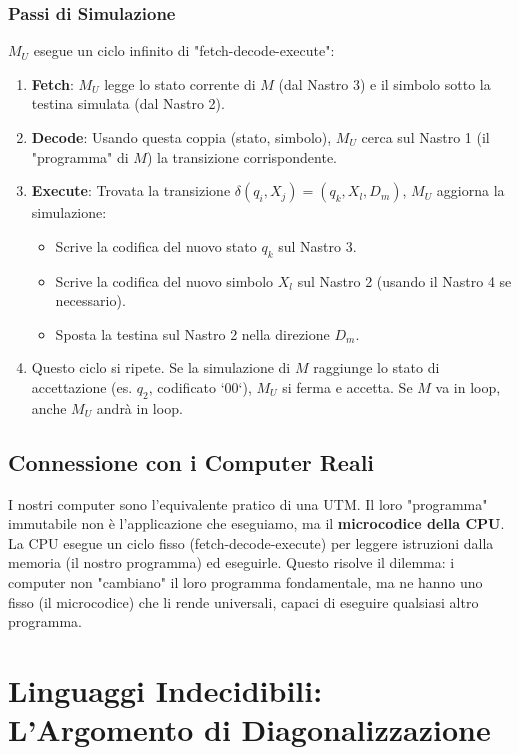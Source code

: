 \documentclass[a4paper]{article}
\theoremstyle{definition} %
\theoremstyle{remark} %
\begin{document}
\subsubsection{Passi di Simulazione}
$M_U$ esegue un ciclo infinito di "fetch-decode-execute":
\begin{enumerate}
    \item \textbf{Fetch}: $M_U$ legge lo stato corrente di $M$ (dal Nastro 3) e il simbolo sotto la testina simulata (dal Nastro 2).
    \item \textbf{Decode}: Usando questa coppia (stato, simbolo), $M_U$ cerca sul Nastro 1 (il "programma" di $M$) la transizione corrispondente.
    \item \textbf{Execute}: Trovata la transizione $\delta(q_i, X_j) = (q_k, X_l, D_m)$, $M_U$ aggiorna la simulazione:
    \begin{itemize}
        \item Scrive la codifica del nuovo stato $q_k$ sul Nastro 3.
        \item Scrive la codifica del nuovo simbolo $X_l$ sul Nastro 2 (usando il Nastro 4 se necessario).
        \item Sposta la testina sul Nastro 2 nella direzione $D_m$.
    \end{itemize}
    \item Questo ciclo si ripete. Se la simulazione di $M$ raggiunge lo stato di accettazione (es. $q_2$, codificato `00`), $M_U$ si ferma e accetta. Se $M$ va in loop, anche $M_U$ andrà in loop.
\end{enumerate}

\subsection{Connessione con i Computer Reali}
I nostri computer sono l'equivalente pratico di una UTM. Il loro "programma" immutabile non è l'applicazione che eseguiamo, ma il \textbf{microcodice della CPU}. La CPU esegue un ciclo fisso (fetch-decode-execute) per leggere istruzioni dalla memoria (il nostro programma) ed eseguirle. Questo risolve il dilemma: i computer non "cambiano" il loro programma fondamentale, ma ne hanno uno fisso (il microcodice) che li rende universali, capaci di eseguire qualsiasi altro programma.

\section{Linguaggi Indecidibili: L'Argomento di Diagonalizzazione}
\end{document}
